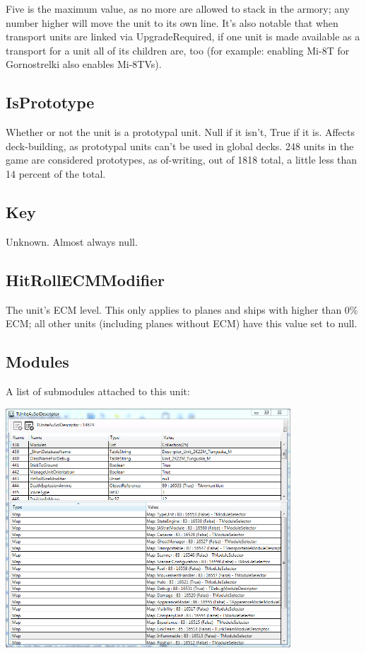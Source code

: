 \documentclass{article}
\begin{document}
Five is the maximum value, as no more are allowed to stack in the armory; any number higher will move the unit to its own line. It's also notable that when transport units are linked via UpgradeRequired, if one unit is made available as a transport for a unit all of its children are, too (for example: enabling Mi-8T for Gornostrelki also enables Mi-8TVs).

\subsection{IsPrototype}

Whether or not the unit is a prototypal unit. Null if it isn't, True if it is. Affects deck-building, as prototypal units can't be used in global decks. 248 units in the game are considered prototypes, as of-writing, out of 1818 total, a little less than 14 percent of the total.

\subsection{Key}

Unknown. Almost always null.

\subsection{HitRollECMModifier}

The unit's ECM level. This only applies to planes and ships with higher than 0\% ECM; all other units (including planes without ECM) have this value set to null.

\subsection{Modules}

A list of submodules attached to this unit:


\includegraphics[width=0.8\textwidth]{screenshot_modules}
\end{document}
